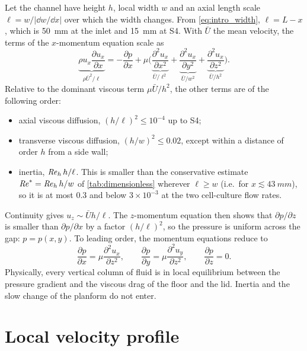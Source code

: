 Let the channel have height $h$, local width $w$ and an axial length scale $\ell=w/|\dd w/\dd x|$ over which the width changes. From \cref{eq:intro_width}, $\ell=L-x$, which is \SI{50}{mm} at the inlet and \SI{15}{mm} at S4. With $\bar U$ the mean velocity, the terms of the $x$-momentum equation scale as
\begin{equation}
\underbrace{\rho u_x\frac{\partial u_x}{\partial x}}_{\rho\bar U^2/\ell}
=-\frac{\partial p}{\partial x}
+\mu\Big(\underbrace{\frac{\partial^2u_x}{\partial x^2}}_{\bar U/\ell^2}
+\underbrace{\frac{\partial^2u_x}{\partial y^2}}_{\bar U/w^2}
+\underbrace{\frac{\partial^2u_x}{\partial z^2}}_{\bar U/h^2}\Big).
\label{eq:th_scaling}
\end{equation}
Relative to the dominant viscous term $\mu\bar U/h^2$, the other terms are of the following order:
\begin{itemize}
\item axial viscous diffusion, $(h/\ell)^2\le10^{-4}$ up to S4;
\item transverse viscous diffusion, $(h/w)^2\le0.02$, except within a distance of order $h$ from a side wall;
\item inertia, $\mathit{Re}_h\,h/\ell$. This is smaller than the conservative estimate $\mathit{Re}^*=\mathit{Re}_h\,h/w$ of \cref{tab:dimensionless} wherever $\ell\ge w$ (i.e.\ for $x\lesssim\SI{43}{mm}$), so it is at most 0.3 and below $3\times10^{-3}$ at the two cell-culture flow rates.
\end{itemize}
Continuity gives $u_z\sim\bar Uh/\ell$. The $z$-momentum equation then shows that $\partial p/\partial z$ is smaller than $\partial p/\partial x$ by a factor $(h/\ell)^2$, so the pressure is uniform across the gap: $p=p(x,y)$. To leading order, the momentum equations reduce to
\begin{equation}
\frac{\partial p}{\partial x}=\mu\frac{\partial^2u_x}{\partial z^2},\qquad
\frac{\partial p}{\partial y}=\mu\frac{\partial^2u_y}{\partial z^2},\qquad
\frac{\partial p}{\partial z}=0 .
\label{eq:th_lub}
\end{equation}
Physically, every vertical column of fluid is in local equilibrium between the pressure gradient and the viscous drag of the floor and the lid. Inertia and the slow change of the planform do not enter.

\section{Local velocity profile}

